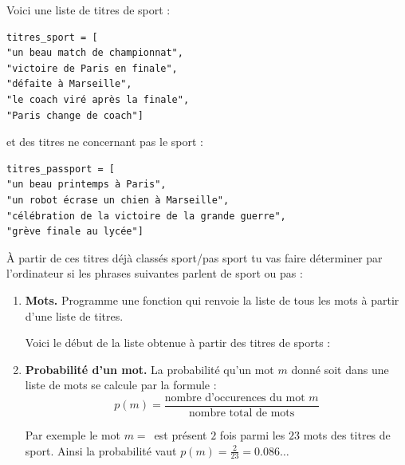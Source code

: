 \documentclass[11pt,class=report,crop=false]{standalone}
\begin{document}
\begin{activite}
	

Voici une liste de titres de sport :

\begin{center}
\begin{minipage}{0.7\textwidth}
\begin{lstlisting}
titres_sport = [
"un beau match de championnat",
"victoire de Paris en finale",
"défaite à Marseille",
"le coach viré après la finale",
"Paris change de coach"]
\end{lstlisting}
\end{minipage}	
\end{center}
et des titres ne concernant pas le sport :
\begin{center}
\begin{minipage}{0.7\textwidth}
\begin{lstlisting}
titres_passport = [
"un beau printemps à Paris",
"un robot écrase un chien à Marseille",
"célébration de la victoire de la grande guerre",
"grève finale au lycée"]
\end{lstlisting}
\end{minipage}	
\end{center}

\`A partir de ces titres déjà classés sport/pas sport tu vas faire déterminer par l'ordinateur si les phrases suivantes parlent de sport ou pas :

\begin{enumerate}
	\item \textbf{Mots.}
	Programme une fonction  qui renvoie la liste de tous les mots à partir d'une liste de titres. 
	
	Voici le début de la liste obtenue à partir des titres de sports :	
	
	\item \textbf{Probabilité d'un mot.}
	La probabilité qu'un mot $m$ donné soit dans une liste de mots se calcule par la formule :
	$$p(m) = \frac{\text{nombre d'occurences du mot } m}{\text{nombre total de mots}}$$
	
	Par exemple le mot $m = \,$ est présent $2$ fois parmi les $23$ mots des titres de sport. Ainsi la probabilité vaut $p(m) = \frac{2}{23} = 0.086\ldots$
	

\end{enumerate}
\end{activite}
\end{document}
